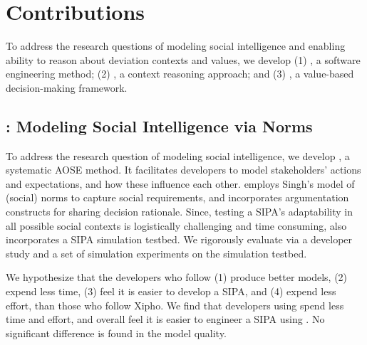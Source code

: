 \section{Contributions}
\label{sec:intro-contributions}

To address the research questions of modeling social intelligence and
enabling ability to reason about deviation contexts and values, we
develop (1) \frameworkA, a software engineering method; (2) \frameworkB, a context
reasoning approach; and (3) \frameworkAinur, a value-based decision-making framework.

\subsection[Modeling Social Intelligence via Norms]{\frameworkA: Modeling Social Intelligence via Norms}

To address the research question of modeling social intelligence, we
develop \frameworkA \citep{Ajmeri-AAMAS17-Arnor}, a systematic 
AOSE method. It facilitates developers to model stakeholders' actions
and expectations, and how these influence each other. \frameworkA
employs Singh's  model of (social) norms to
capture social requirements, and incorporates argumentation constructs
\citep{BenchCapon-2007-Argumentation+AI} for sharing decision rationale.
Since, testing a SIPA's adaptability in all possible social contexts is
logistically challenging and time consuming, \frameworkA also
incorporates a SIPA simulation testbed. We rigorously evaluate
\frameworkA via a developer study and a set of simulation experiments on
the simulation testbed. 


We hypothesize that the developers who follow \frameworkA (1) produce
better models, (2) expend less time, (3) feel it is easier to develop a
SIPA, and (4) expend less effort, than those who follow Xipho. We find
that developers using \frameworkA spend less time and effort, and
overall feel it is easier to engineer a SIPA using \frameworkA. No
significant difference is found in the model quality.

